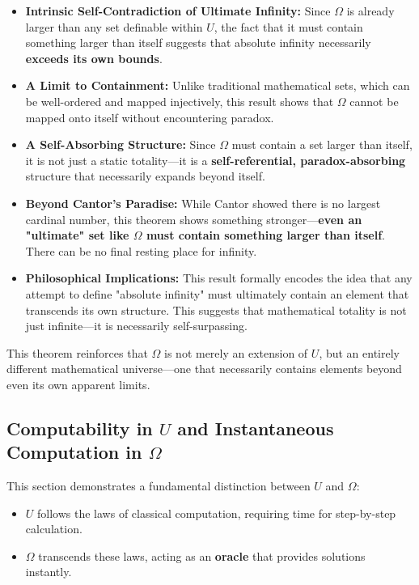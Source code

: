 \documentclass[12pt]{article}
\begin{document}
\begin{itemize}
    \item \textbf{Intrinsic Self-Contradiction of Ultimate Infinity:} Since \( \Omega \) is already larger than any set definable within \( U \), the fact that it must contain something larger than itself suggests that absolute infinity necessarily \textbf{exceeds its own bounds}.
    \item \textbf{A Limit to Containment:} Unlike traditional mathematical sets, which can be well-ordered and mapped injectively, this result shows that \( \Omega \) cannot be mapped onto itself without encountering paradox.
    \item \textbf{A Self-Absorbing Structure:} Since \( \Omega \) must contain a set larger than itself, it is not just a static totality—it is a \textbf{self-referential, paradox-absorbing} structure that necessarily expands beyond itself.
    \item \textbf{Beyond Cantor’s Paradise:} While Cantor showed there is no largest cardinal number, this theorem shows something stronger—\textbf{even an "ultimate" set like \( \Omega \) must contain something larger than itself}. There can be no final resting place for infinity.
    \item \textbf{Philosophical Implications:} This result formally encodes the idea that any attempt to define "absolute infinity" must ultimately contain an element that transcends its own structure. This suggests that mathematical totality is not just infinite—it is necessarily self-surpassing.
\end{itemize}

This theorem reinforces that \( \Omega \) is not merely an extension of \( U \), but an entirely different mathematical universe—one that necessarily contains elements beyond even its own apparent limits.


\subsection{Computability in \( U \) and Instantaneous Computation in \( \Omega \)}

This section demonstrates a fundamental distinction between \( U \) and \( \Omega \):

\begin{itemize}
    \item \( U \) follows the laws of classical computation, requiring time for step-by-step calculation.
    \item \( \Omega \) transcends these laws, acting as an \textbf{oracle} that provides solutions instantly.
\end{itemize}
\end{document}
